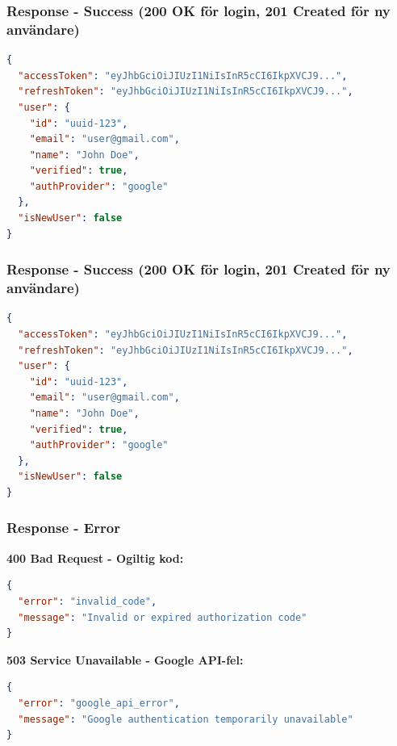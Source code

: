 \documentclass[12pt,a4paper]{article}
\begin{document}
\subsubsection{Response - Success (200 OK för login, 201 Created för ny användare)}
\begin{lstlisting}[language=json]
{
  "accessToken": "eyJhbGciOiJIUzI1NiIsInR5cCI6IkpXVCJ9...",
  "refreshToken": "eyJhbGciOiJIUzI1NiIsInR5cCI6IkpXVCJ9...",
  "user": {
    "id": "uuid-123",
    "email": "user@gmail.com",
    "name": "John Doe",
    "verified": true,
    "authProvider": "google"
  },
  "isNewUser": false
}
\end{lstlisting}

\subsubsection{Response - Success (200 OK för login, 201 Created för ny användare)}
\begin{lstlisting}[language=json]
{
  "accessToken": "eyJhbGciOiJIUzI1NiIsInR5cCI6IkpXVCJ9...",
  "refreshToken": "eyJhbGciOiJIUzI1NiIsInR5cCI6IkpXVCJ9...",
  "user": {
    "id": "uuid-123",
    "email": "user@gmail.com",
    "name": "John Doe",
    "verified": true,
    "authProvider": "google"
  },
  "isNewUser": false
}
\end{lstlisting}

\subsubsection{Response - Error}
\textbf{400 Bad Request - Ogiltig kod:}
\begin{lstlisting}[language=json]
{
  "error": "invalid_code",
  "message": "Invalid or expired authorization code"
}
\end{lstlisting}

\textbf{503 Service Unavailable - Google API-fel:}
\begin{lstlisting}[language=json]
{
  "error": "google_api_error",
  "message": "Google authentication temporarily unavailable"
}
\end{lstlisting}
\end{document}
